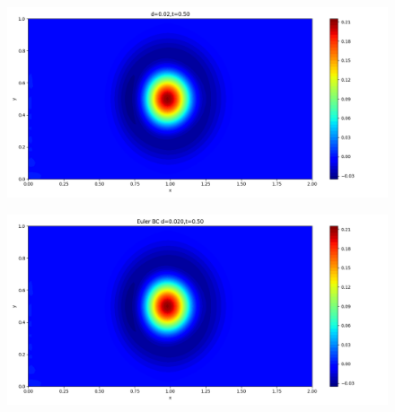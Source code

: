 \documentclass[12pt]{article}
\begin{document}
\begin{figure}[H]
\begin{minipage}{\linewidth}
    \begin{minipage}{0.5\textwidth}
    \includegraphics[width=\linewidth]{figures/3d0.02t0.50.png}
    \label{fig1}
    \end{minipage}\hfill
    \begin{minipage}{0.5\textwidth}
    \includegraphics[width=\linewidth]{figures/3Ed0.020t0.50.png}
    \label{fig2}
    \end{minipage}
    \vspace{-1.5em}
    

\end{minipage}
\end{figure}
\end{document}

